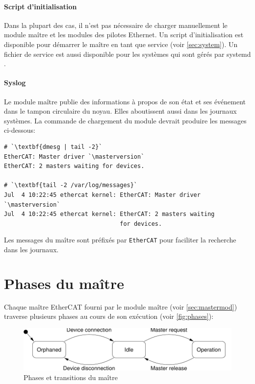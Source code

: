 \documentclass[a4paper,12pt,BCOR6mm,bibtotoc,idxtotoc]{scrbook}
\newcommand{\masterversion}{1.5.2}
\begin{document}
\paragraph{Script d'initialisation}

Dans la plupart des cas, il n'est pas n\'ecessaire de charger
manuellement le module ma\^itre et les modules des pilotes Ethernet.
Un script d'initialisation est disponible pour d\'emarrer le ma\^itre
en tant que service (voir \autoref{sec:system}). Un fichier de service
est aussi disponible pour les syst\`emes qui sont g\'er\'es par
systemd \cite{systemd}.

\paragraph{Syslog}

Le module ma\^itre publie des informations \`a propos de son \'etat et ses
\'ev\'enement dans le tampon circulaire du noyau. Elles aboutissent aussi
dans les journaux syst\`emes. La commande de chargement du module
devrait produire les messages ci-dessous:

\begin{lstlisting}
# `\textbf{dmesg | tail -2}`
EtherCAT: Master driver `\masterversion`
EtherCAT: 2 masters waiting for devices.

# `\textbf{tail -2 /var/log/messages}`
Jul  4 10:22:45 ethercat kernel: EtherCAT: Master driver `\masterversion`
Jul  4 10:22:45 ethercat kernel: EtherCAT: 2 masters waiting
                                 for devices.
\end{lstlisting}

Les messages du ma\^itre sont pr\'efix\'es par \lstinline+EtherCAT+ pour
faciliter la recherche dans les journaux.


\section{Phases du ma\^itre}

Chaque ma\^itre EtherCAT fourni par le module ma\^itre (voir
\autoref{sec:mastermod}) traverse plusieurs phases au cours de son
ex\'ecution (voir \autoref{fig:phases}):

\begin{figure}[htbp]
  \centering
  \includegraphics[width=.9\textwidth]{images/phases}
  \caption{Phases et transitions du ma\^itre}
  \label{fig:phases}
\end{figure}
\end{document}
